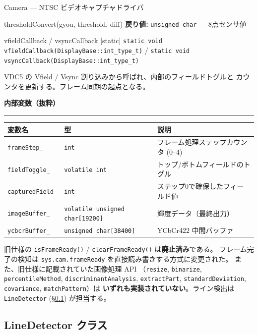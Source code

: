 \documentclass[a4paper,11pt,dvipdfmx]{jsarticle}
\makeatletter
\newcommand{\apisection}[1]{%
  \par\addvspace{4mm}%
  {\normalsize\bfseries\color{headerblue} #1}%
  \par\vspace{-1mm}%
  {\color{accentblue!40}\rule{\linewidth}{0.5pt}}%
  \par\nobreak\vspace{2mm}%
  \@afterheading
}
\makeatother
\begin{document}
\begin{apibox}{Camera --- NTSC ビデオキャプチャドライバ}
\begin{funcblock}{thresholdConvert(gyou, threshold, diff)}
\textbf{戻り値:} \texttt{unsigned char} --- 8点センサ値
\end{funcblock}

\begin{funcblock}{vfieldCallback / vsyncCallback \normalfont\small\color{gray}[static]}
\texttt{static void vfieldCallback(DisplayBase::int\_type\_t)} /
\texttt{static void vsyncCallback(DisplayBase::int\_type\_t)}

\vspace{1.5mm}
VDC5 の Vfield / Vsync 割り込みから呼ばれ、内部のフィールドトグルと
カウンタを更新する。フレーム同期の起点となる。
\end{funcblock}

\apisection{内部変数（抜粋）}

\begin{tabularx}{\textwidth}{l l X}
\toprule
\textbf{変数名} & \textbf{型} & \textbf{説明} \\
\midrule
\texttt{frameStep\_}     & \texttt{int}  & フレーム処理ステップカウンタ (0--4) \\
\texttt{fieldToggle\_}   & \texttt{volatile int} & トップ/ボトムフィールドのトグル \\
\texttt{capturedField\_} & \texttt{int}  & ステップ0で確保したフィールド値 \\
\texttt{imageBuffer\_}   & \texttt{volatile unsigned char[19200]} & 輝度データ（最終出力） \\
\texttt{ycbcrBuffer\_}   & \texttt{unsigned char[38400]} & YCbCr422 中間バッファ \\
\bottomrule
\end{tabularx}

\begin{cautionbox}
旧仕様の \texttt{isFrameReady()} / \texttt{clearFrameReady()} は\textbf{廃止済み}である。
フレーム完了の検知は \texttt{sys.cam.frameReady} を直接読み書きする方式に変更された。
また、旧仕様に記載されていた画像処理 API
（\texttt{resize}, \texttt{binarize}, \texttt{percentileMethod},
\texttt{discriminantAnalysis}, \texttt{extractPart},
\texttt{standardDeviation}, \texttt{covariance}, \texttt{matchPattern}）は
\textbf{いずれも実装されていない}。ライン検出は \texttt{LineDetector}
(\hyperref[sec:api-linedetector]{§\ref*{sec:api-linedetector}}) が担当する。
\end{cautionbox}

\end{apibox}

\subsection{LineDetector クラス}\label{sec:api-linedetector}
\end{document}
